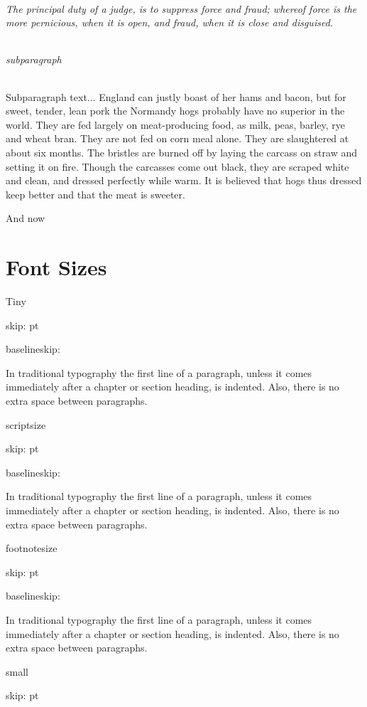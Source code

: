 \documentclass[a4paper, 12pt]{memoir}
\begin{document}
\subparagraph*{ The principal duty of a judge, is to suppress force and fraud; whereof force is the more pernicious, when it is open, and fraud, when it is close and disguised. }
\subparagraph*{subparagraph} 
Subparagraph text... England can justly boast of her hams and bacon, but for sweet, tender, lean pork the Normandy hogs probably have no superior in the world. They are fed largely on meat-producing food, as milk, peas, barley, rye and wheat bran. They are not fed on corn meal alone. They are slaughtered at about six months. The bristles are burned off by laying the carcass on straw and setting it on fire. Though the carcasses come out black, they are scraped white and clean, and dressed perfectly while warm. It is believed that hogs thus dressed keep better and that the meat is sweeter.


And now

\chapter*{ Font Sizes } 

\makeatletter
\newcommand\thefontsize{ \f@size pt}
\makeatother

\tiny
 Tiny 
 
 skip: \thefontsize
 
 baselineskip: \the\baselineskip 
 
In traditional typography the first line of a paragraph, unless it comes immediately after a
chapter or section heading, is indented. Also, there is no extra space between paragraphs.

\scriptsize
 scriptsize
 
 skip: \thefontsize
 
 baselineskip: \the\baselineskip 
 
In traditional typography the first line of a paragraph, unless it comes immediately after a
chapter or section heading, is indented. Also, there is no extra space between paragraphs.

\footnotesize
 footnotesize
 
 skip: \thefontsize
 
 baselineskip: \the\baselineskip 
 
In traditional typography the first line of a paragraph, unless it comes immediately after a
chapter or section heading, is indented. Also, there is no extra space between paragraphs.

\small
 small
 
 skip: \thefontsize
 
\end{document}
